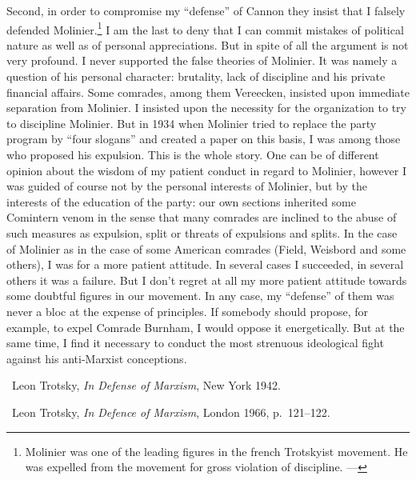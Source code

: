 Second, in order to compromise my “defense” of Cannon they insist that I falsely defended Molinier.\footnote{Molinier was one of the leading figures in the french Trotskyist movement. He was expelled from the movement for gross violation of discipline. ---\ed} I am the last to deny that I can commit mistakes of political nature as well as of personal appreciations. But in spite of all the argument is not very profound. I never supported the false theories of Molinier. It was namely a question of his personal character: brutality, lack of discipline and his private financial affairs. Some comrades, among them Vereecken, insisted upon immediate separation from Molinier. I insisted upon the necessity for the organization to try to discipline Molinier. But in 1934 when Molinier tried to replace the party program by “four slogans” and created a paper on this basis, I was among those who proposed his expulsion. This is the whole story. One can be of different opinion about the wisdom of my patient conduct in regard to Molinier, however I was guided of course not by the personal interests of Molinier, but by the interests of the education of the party: our own sections inherited some Comintern venom in the sense that many comrades are inclined to the abuse of such measures as expulsion, split or threats of expulsions and splits. In the case of Molinier as in the case of some American comrades (Field, Weisbord and some others), I was for a more patient attitude. In several cases I succeeded, in several others it was a failure. But I don’t regret at all my more patient attitude towards some doubtful figures in our movement. In any case, my “defense” of them was never a bloc at the expense of principles. If somebody should propose, for example, to expel Comrade Burnham, I would oppose it energetically. But at the same time, I find it necessary to conduct the most strenuous ideological fight against his anti-Marxist conceptions.


\begin{letterinfo}
	\firstpublished\ Leon Trotsky, \emph{In Defense of Marxism}, New York 1942.
	
	\checkedagainst\ Leon Trotsky, \emph{In Defence of Marxism}, London 1966, p.~121--122.
	
	\footnoteslatter
\end{letterinfo}
